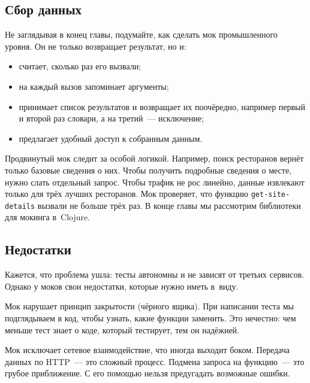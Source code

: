 \subsection{Сбор данных}


Не заглядывая в конец главы, подумайте, как сделать мок промышленного уровня. Он
не только возвращает результат, но и:

\begin{itemize}

\item
  считает, сколько раз его вызвали;

\item
  на каждый вызов запоминает аргументы;

\item
  принимает список результатов и возвращает их поочёредно, например первый и
  второй раз словари, а на третий~--- исключение;

\item
  предлагает удобный доступ к собранным данным.

\end{itemize}

Продвинутый мок следит за особой логикой. Например, поиск ресторанов вернёт
только базовые сведения о них. Чтобы получить подробные сведения о месте, нужно
слать отдельный запрос. Чтобы трафик не рос линейно, данные извлекают только для
трёх лучших ресторанов. Мок проверяет, что функцию \verb|get-site-details|
вызвали не больше трёх раз. В конце главы мы рассмотрим библиотеки для мокинга
в~Clojure.

\subsection{Недостатки}

Кажется, что проблема ушла: тесты автономны и не зависят от третьих
сервисов. Однако у моков свои недостатки, которые нужно иметь в~виду.

Мок нарушает принцип закрытости (чёрного ящика). При написании теста мы
подглядываем в код, чтобы узнать, какие функции заменить. Это нечестно: чем
меньше тест знает о коде, который тестирует, тем он надёжней.

Мок исключает сетевое взаимодействие, что иногда выходит боком. Передача данных
по HTTP~--- это сложный процесс. Подмена запроса на функцию~--- это грубое
приближение. С его помощью нельзя предугадать возможные ошибки.

